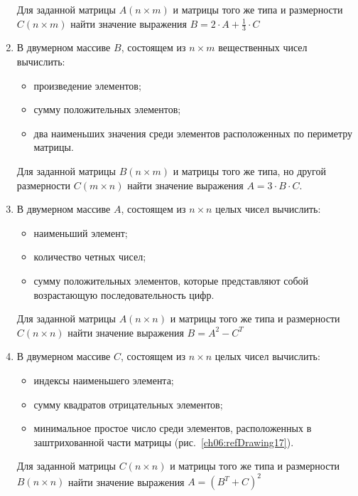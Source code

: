 \begin{enumerate}
Для заданной матрицы $A(n\times m)$ и матрицы того же типа и размерности
$C(n\times m)$ найти значение выражения  $B=2\cdot A+\frac{1}{3}\cdot C$  

\item В двумерном массиве $B$, состоящем из $n\times m$ вещественных чисел вычислить:
\begin{itemize}
\item произведение элементов;
\item сумму положительных элементов;
\item два наименьших значения среди элементов расположенных по периметру матрицы.
\end{itemize}

Для заданной матрицы $B(n\times m)$ и матрицы того же типа, но другой размерности  
$C(m\times n)$ найти значение выражения  $A=3\cdot B\cdot C$.

\item В двумерном массиве $A$, состоящем из $n\times n$ целых чисел вычислить: 
\begin{itemize}
\item наименьший элемент;
\item количество четных чисел;
\item сумму положительных элементов, которые представляют собой возрастающую последовательность цифр.
\end{itemize}

Для заданной матрицы $A(n\times n)$ и матрицы того же типа и размерности
$C(n\times n)$ найти значение выражения  $B=A^2-C^T$  

\item В двумерном массиве $C$, состоящем из $n\times n$ целых чисел вычислить:
\begin{itemize}
\item индексы наименьшего элемента;
\item сумму квадратов отрицательных элементов;
\item минимальное простое число среди элементов, расположенных в заштрихованной 
части матрицы (рис.~\ref{ch06:refDrawing17}).
\end{itemize}

Для заданной матрицы $C(n\times n)$ и матрицы того же типа и размерности
$B(n\times n)$ найти значение выражения  $A=(B^T+C)^2$  


\end{enumerate}
